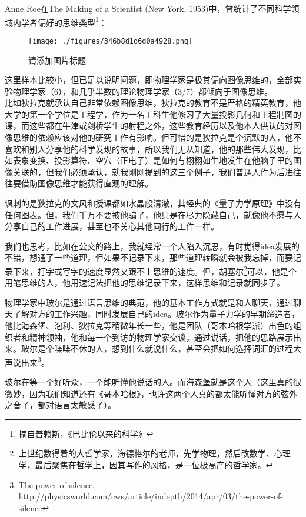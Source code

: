 Anne Roe在The Making of a Scientist (New York, 1953)中，曾统计了不同科学领域内学者偏好的思维类型\footnote{摘自普赖斯，《巴比伦以来的科学》}：

\begin{figure}[ht]
\centering
\texttt{[image: ./figures/346b8d1d6d0a4928.png]}
\caption{请添加图片标题} \label{fig_QMPre2_1}
\end{figure}
这里样本比较小，但已足以说明问题，即物理学家是极其偏向图像思维的，全部实验物理学家（6），和几乎半数的理论物理学家（3/7）都倾向于图像思维。\\


比如狄拉克就承认自己非常依赖图像思维，狄拉克的教育不是严格的精英教育，他大学的第一个学位是工程学，作为一名工科生他修习了大量投影几何和工程制图的课，而这些都在牛津或剑桥学生的射程之外，这些教育经历以及他本人供认的对图像思维的依赖应该对他的研究工作有影响。但可惜的是狄拉克是个沉默的人，他不喜欢和别人分享他的科学发现的故事，所以我们无从知道，他的那些伟大发现，比如表象变换、投影算符、空穴（正电子）是如何与栩栩如生地发生在他脑子里的图像关联的，但我们必须承认，就我刚刚提到的这三个例子，我们普通人作为后进往往要借助图像思维才能获得直观的理解。

讽刺的是狄拉克的文风和授课都如水晶般清澈，其经典的《量子力学原理》中没有任何图表。但，我们千万不要被他骗了，他只是在尽力隐藏自己，就像他不愿与人分享自己的工作进展，甚至也不关心其他同行的工作一样。

我们也思考，比如在公交的路上，我就经常一个人陷入沉思，有时觉得idea发展的不错，想通了一些道理，但如果不记录下来，那些道理转瞬就会被我忘掉，而要记录下来，打字或写字的速度显然又跟不上思维的速度。但，胡塞尔\footnote{上世纪数得着的大哲学家，海德格尔的老师，先学物理，然后改数学、心理学，最后聚焦在哲学上，因其写作的风格，是一位极高产的哲学家。}可以，他是个用笔思维的人，他用速记法把他的思维记录下来，这样思维和记录就同步了。

物理学家中玻尔是通过语言思维的典范，他的基本工作方式就是和人聊天，通过聊天了解对方的工作兴趣，同时发展自己的idea。玻尔作为量子力学的早期缔造者，他比海森堡、泡利、狄拉克等稍微年长一些，他是团队（哥本哈根学派）出色的组织者和精神领袖，他和每一个到访的物理学家交谈，通过说话，把他的思路展示出来。玻尔是个喋喋不休的人，想到什么就说什么，甚至会把如何选择词汇的过程大声说出来\footnote{The power of silence. {http://physicsworld.com/cws/article/indepth/2014/apr/03/the-power-of-silence}}。

玻尔在等一个好听众，一个能听懂他说话的人。而海森堡就是这个人（这里真的很微妙，因为我们知道还有《哥本哈根》，也许这两个人真的都太能听懂对方的弦外之音了，都对语言太敏感了）。

